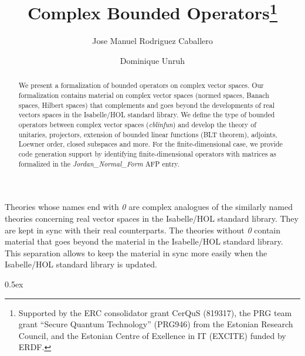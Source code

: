 \documentclass[11pt,a4paper]{article}
\begin{document}
\title{Complex Bounded Operators\thanks{Supported by the ERC consolidator grant CerQuS (819317), the PRG team grant “Secure Quantum Technology” (PRG946) from the Estonian Research Council, and the Estonian Centre of Exellence in IT (EXCITE) funded by ERDF.}}
\author[1]{Jose Manuel Rodriguez Caballero}
\author[1]{Dominique Unruh}

\maketitle

\begin{abstract}
  We present a formalization of bounded operators on complex vector spaces.
  Our formalization contains material on complex vector spaces (normed spaces, Banach spaces, Hilbert spaces)
  that complements and goes beyond the developments of real vectors spaces in the Isabelle/HOL standard library.
  We define the type of bounded operators between complex vector spaces (\textit{cblinfun}) and develop the theory of
  unitaries, projectors, extension of bounded linear functions (BLT theorem), adjoints, Loewner order, closed subspaces and more.
  For the finite-dimensional case, we provide code generation support by identifying finite-dimensional operators with matrices
  as formalized in the \textit{Jordan\_Normal\_Form} AFP entry.
\end{abstract}

\tableofcontents

Theories whose names end with \textit{0} are complex analogues of the similarly named theories concerning real vector spaces in the Isabelle/HOL standard library.
They are kept in sync with their real counterparts. The theories without \textit{0} contain material that goes beyond the material in the Isabelle/HOL standard library.
This separation allows to keep the material in sync more easily when the Isabelle/HOL standard library is updated.

\parindent 0pt\parskip 0.5ex





\end{document}
